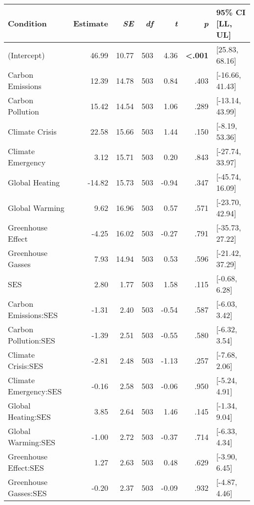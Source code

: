 \begin{table}[ht]
\centering
\begin{tabular}{lrrrrrl}
  \hline
Condition & Estimate & \textit{SE} & \textit{df} & \textit{t} & \textit{p} & 95\% CI [LL, UL] \\ 
  \hline
(Intercept) & 46.99 & 10.77 & 503 & 4.36 & \textbf{\textless  .001} & [25.83, 68.16] \\ 
  Carbon Emissions & 12.39 & 14.78 & 503 & 0.84 & .403 & [-16.66, 41.43] \\ 
  Carbon Pollution & 15.42 & 14.54 & 503 & 1.06 & .289 & [-13.14, 43.99] \\ 
  Climate Crisis & 22.58 & 15.66 & 503 & 1.44 & .150 & [-8.19, 53.36] \\ 
  Climate Emergency & 3.12 & 15.71 & 503 & 0.20 & .843 & [-27.74, 33.97] \\ 
  Global Heating & -14.82 & 15.73 & 503 & -0.94 & .347 & [-45.74, 16.09] \\ 
  Global Warming & 9.62 & 16.96 & 503 & 0.57 & .571 & [-23.70, 42.94] \\ 
  Greenhouse Effect & -4.25 & 16.02 & 503 & -0.27 & .791 & [-35.73, 27.22] \\ 
  Greenhouse Gasses & 7.93 & 14.94 & 503 & 0.53 & .596 & [-21.42, 37.29] \\ 
  SES & 2.80 & 1.77 & 503 & 1.58 & .115 & [-0.68, 6.28] \\ 
  Carbon Emissions:SES & -1.31 & 2.40 & 503 & -0.54 & .587 & [-6.03, 3.42] \\ 
  Carbon Pollution:SES & -1.39 & 2.51 & 503 & -0.55 & .580 & [-6.32, 3.54] \\ 
  Climate Crisis:SES & -2.81 & 2.48 & 503 & -1.13 & .257 & [-7.68, 2.06] \\ 
  Climate Emergency:SES & -0.16 & 2.58 & 503 & -0.06 & .950 & [-5.24, 4.91] \\ 
  Global Heating:SES & 3.85 & 2.64 & 503 & 1.46 & .145 & [-1.34, 9.04] \\ 
  Global Warming:SES & -1.00 & 2.72 & 503 & -0.37 & .714 & [-6.33, 4.34] \\ 
  Greenhouse Effect:SES & 1.27 & 2.63 & 503 & 0.48 & .629 & [-3.90, 6.45] \\ 
  Greenhouse Gasses:SES & -0.20 & 2.37 & 503 & -0.09 & .932 & [-4.87, 4.46] \\ 
   \hline
\end{tabular}
\end{table}
